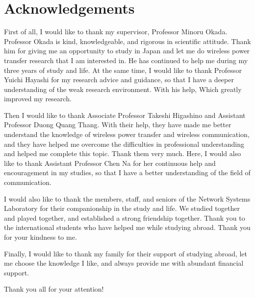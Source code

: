 \chapter*{Acknowledgements}

First of all, I would like to thank my supervisor, Professor Minoru Okada. Professor Okada is kind, knowledgeable, and rigorous in scientific attitude. Thank him for giving me an opportunity to study in Japan and let me do wireless power transfer research that I am interested in. He has continued to help me during my three years of study and life. At the same time, I would like to thank Professor Yuichi Hayashi for my research advice and guidance, so that I have a deeper understanding of the weak research environment. With his help, Which greatly improved my research.

Then I would like to thank Associate Professor Takeshi Higashino and Assistant Professor Duong Quang Thang. With their help, they have made me better understand the knowledge of wireless power transfer and wireless communication, and they have helped me overcome the difficulties in professional understanding and helped me complete this topic. Thank them very much. Here, I would also like to thank Assistant Professor Chen Na for her continuous help and encouragement in my studies, so that I have a better understanding of the field of communication.

I would also like to thank the members, staff, and seniors of the Network Systems Laboratory for their companionship in the study and life. We studied together and played together, and established a strong friendship together. Thank you to the international students who have helped me while studying abroad. Thank you for your kindness to me.

Finally, I would like to thank my family for their support of studying abroad, let me choose the knowledge I like, and always provide me with abundant financial support.

Thank you all for your attention!